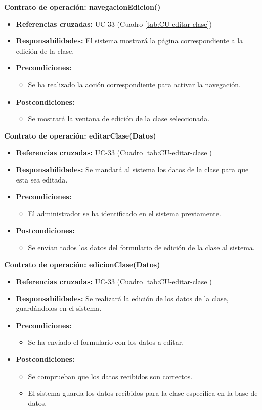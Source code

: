\textbf{Contrato de operación: navegacionEdicion()}
\begin{itemize}
\item \textbf{Referencias cruzadas:} UC-33 (Cuadro \ref{tab:CU-editar-clase})
\item \textbf{Responsabilidades:} El sistema mostrará la página correspondiente a la edición de la clase.
\item \textbf{Precondiciones:} 
 \begin{itemize}
\item Se ha realizado la acción correspondiente para activar la navegación.
\end {itemize}
\item \textbf{Postcondiciones:} 
 \begin{itemize}
\item Se mostrará la ventana de edición de la clase seleccionada.
\end {itemize}
\end {itemize}

\textbf{Contrato de operación: editarClase(Datos)}
\begin{itemize}
\item \textbf{Referencias cruzadas:} UC-33 (Cuadro \ref{tab:CU-editar-clase})
\item \textbf{Responsabilidades:} Se mandará al sistema los datos de la clase para que esta sea editada.
\item \textbf{Precondiciones:} 
 \begin{itemize}
\item El administrador se ha identificado en el sistema previamente.
\end {itemize}
\item \textbf{Postcondiciones:} 
 \begin{itemize}
\item Se envían todos los datos del formulario de edición de la clase al sistema.
\end {itemize}
\end {itemize}

\textbf{Contrato de operación: edicionClase(Datos)}
\begin{itemize}
\item \textbf{Referencias cruzadas:} UC-33 (Cuadro \ref{tab:CU-editar-clase})
\item \textbf{Responsabilidades:} Se realizará la edición de los datos de la clase, guardándolos en el sistema.
\item \textbf{Precondiciones:} 
 \begin{itemize}
\item Se ha enviado el formulario con los datos a editar.
\end {itemize}
\item \textbf{Postcondiciones:} 
 \begin{itemize}
 \item Se comprueban que los datos recibidos son correctos.
\item El sistema guarda los datos recibidos para la clase específica en la base de datos.
\end {itemize}
\end {itemize}

